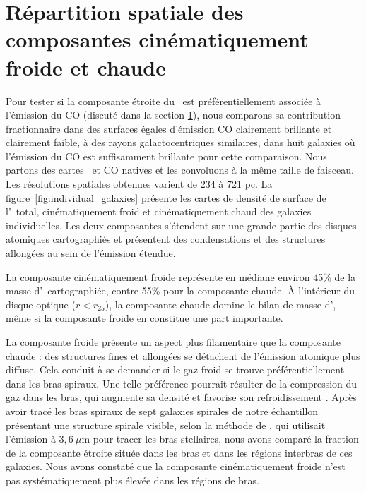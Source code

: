 \section[Répartition spatiale des composantes cinématiquement froide et chaude]{Répartition spatiale des composantes cinématiquement froide et chaude}
\label{sec:phase_spatial_distribution}

Pour tester si la composante étroite du \HI\ est préférentiellement associée à l'émission du CO (discut\'e dans la section \ref{sec:phase_spatial_distribution}), nous comparons sa contribution fractionnaire dans des surfaces égales d'émission CO clairement brillante et clairement faible, à des rayons galactocentriques similaires, dans huit galaxies où l'émission du CO est suffisamment brillante pour cette comparaison. Nous partons des cartes \HI\ et CO natives et les convoluons à la même taille de faisceau. Les résolutions spatiales obtenues varient de 234 à 721 pc.
La figure~\ref{fig:individual_galaxies} présente les cartes de densité de surface de l'\HI\ total, cinématiquement froid et cinématiquement chaud des galaxies individuelles. Les deux composantes s'étendent sur une grande partie des disques atomiques cartographiés et présentent des condensations et des structures allongées au sein de l'émission étendue.

La composante cinématiquement froide représente en médiane environ 45\% de la masse d'\HI\ cartographiée, contre 55\% pour la composante chaude. À l'intérieur du disque optique ($r<r_{25}$), la composante chaude domine le bilan de masse d'\HI, même si la composante froide en constitue une part importante.

La composante froide présente un aspect plus filamentaire que la composante chaude : des structures fines et allongées se détachent de l'émission atomique plus diffuse. Cela conduit à se demander si le gaz froid se trouve préférentiellement dans les bras spiraux. Une telle préférence pourrait résulter de la compression du gaz dans les bras, qui augmente sa densité et favorise son refroidissement \citep{KimSpiral2008}. Après avoir tracé les bras spiraux de sept galaxies spirales de notre échantillon présentant une structure spirale visible, selon la méthode de \citet{Foyle2010}, qui utilisait l'émission à $3{,}6~\mu$m pour tracer les bras stellaires, nous avons comparé la fraction de la composante étroite située dans les bras et dans les régions interbras de ces galaxies. Nous avons constaté que la composante cinématiquement froide n'est pas systématiquement plus élevée dans les régions de bras.

